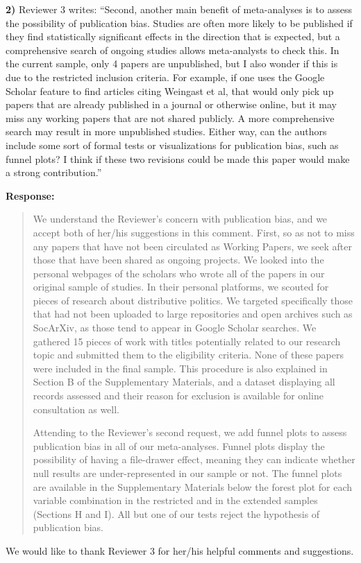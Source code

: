 \documentclass[a4paper,12pt]{article}
\begin{document}
\vspace{.3cm}

\noindent \textbf{2)} Reviewer 3 writes: ``Second, another main benefit of meta-analyses is to assess the possibility of publication bias. Studies are often more likely to be published if they find statistically significant effects in the direction that is expected, but a comprehensive search of ongoing studies allows meta-analysts to check this. In the current sample, only 4 papers are unpublished, but I also wonder if this is due to the restricted inclusion criteria. For example, if one uses the Google Scholar feature to find articles citing Weingast et al, that would only pick up papers that are already published in a journal or otherwise online, but it may miss any working papers that are not shared publicly. A more comprehensive search may result in more unpublished studies. Either way, can the authors include some sort of formal tests or visualizations for publication bias, such as funnel plots? I think if these two revisions could be made this paper would make a strong contribution.''

\vspace{.3cm}

\noindent \textbf{Response:} 
\begin{quote}
    We understand the Reviewer's concern with publication bias, and we accept both of her/his suggestions in this comment. First, so as not to miss any papers that have not been circulated as Working Papers, we seek after those that have been shared as ongoing projects. We looked into the personal webpages of the scholars who wrote all of the papers in our original sample of studies. In their personal platforms, we scouted for pieces of research about distributive politics. We targeted specifically those that had not been uploaded to large repositories and open archives such as SocArXiv, as those tend to appear in Google Scholar searches. We gathered 15 pieces of work with titles potentially related to our research topic and submitted them to the eligibility criteria. None of these papers were included in the final sample. This procedure is also explained in Section B of the Supplementary Materials, and a dataset displaying all records assessed and their reason for exclusion is available for online consultation as well.
    
    Attending to the Reviewer's second request, we add \citet{egger1997bias} funnel plots to assess publication bias in all of our meta-analyses. Funnel plots display the possibility of having a file-drawer effect, meaning they can indicate whether null results are under-represented in our sample or not. The funnel plots are available in the Supplementary Materials below the forest plot for each variable combination in the restricted and in the extended samples (Sections H and I). All but one of our \citet{egger1997bias} tests reject the hypothesis of publication bias.
\end{quote}

We would like to thank Reviewer 3 for her/his helpful comments and suggestions.


\newpage


\end{document}
